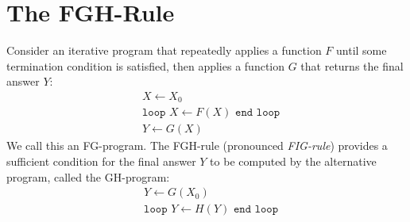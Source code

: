 
\section{The FGH-Rule}

\label{sec:fgh}



Consider an iterative program that repeatedly applies a function $F$
until some termination condition is satisfied, then applies a function $G$ that
returns the final answer $Y$:
%
\begin{align}
  & X \leftarrow  X_0 \nonumber \\
  & \texttt{loop } X \leftarrow F(X) \texttt{ end loop} \label{eq:f}\\
  & Y \leftarrow G(X) \nonumber
\end{align}
%
We call this an FG-program.  The FGH-rule (pronounced {\em FIG-rule})
provides a sufficient condition for the final answer $Y$ to be
computed by the alternative program, called the GH-program:
%
\begin{align}
  & Y \leftarrow  G(X_0) \nonumber \\
  & \texttt{loop } Y \leftarrow H(Y) \texttt{ end loop} \label{eq:h}
\end{align}

